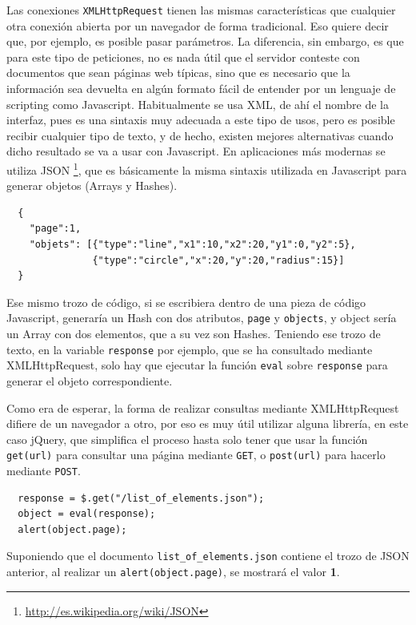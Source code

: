 Las conexiones \texttt{XMLHttpRequest} tienen las mismas características que cualquier otra conexión abierta por un navegador de forma tradicional. Eso quiere decir que, por ejemplo, es posible pasar parámetros. La diferencia, sin embargo, es que para este tipo de peticiones, no es nada útil que el servidor conteste con documentos que sean páginas web típicas, sino que es necesario que la información sea devuelta en algún formato fácil de entender por un lenguaje de scripting como Javascript. Habitualmente se usa XML, de ahí el nombre de la interfaz, pues es una sintaxis muy adecuada a este tipo de usos, pero es posible recibir cualquier tipo de texto, y de hecho, existen mejores alternativas cuando dicho resultado se va a usar con Javascript. En aplicaciones más modernas se utiliza JSON \footnote{\url{http://es.wikipedia.org/wiki/JSON}}, que es básicamente la misma sintaxis utilizada en Javascript para generar objetos (Arrays y Hashes).

\begin{verbatim}
  {
    "page":1,
    "objets": [{"type":"line","x1":10,"x2":20,"y1":0,"y2":5},
               {"type":"circle","x":20,"y":20,"radius":15}]
  }
\end{verbatim}

Ese mismo trozo de código, si se escribiera dentro de una pieza de código Javascript, generaría un Hash con dos atributos, \texttt{page} y \texttt{objects}, y object sería un Array con dos elementos, que a su vez son Hashes. Teniendo ese trozo de texto, en la variable \texttt{response} por ejemplo, que se ha consultado mediante XMLHttpRequest, solo hay que ejecutar la función \texttt{eval} sobre \texttt{response} para generar el objeto correspondiente.

Como era de esperar, la forma de realizar consultas mediante XMLHttpRequest difiere de un navegador a otro, por eso es muy útil utilizar alguna librería, en este caso jQuery, que simplifica el proceso hasta solo tener que usar la función \texttt{get(url)} para consultar una página mediante \texttt{GET}, o \texttt{post(url)} para hacerlo mediante \texttt{POST}.

\begin{verbatim}
  response = $.get("/list_of_elements.json");
  object = eval(response);
  alert(object.page);
\end{verbatim}

Suponiendo que el documento \texttt{list\_of\_elements.json} contiene el trozo de JSON anterior, al realizar un \texttt{alert(object.page)}, se mostrará el valor \textbf{1}.

